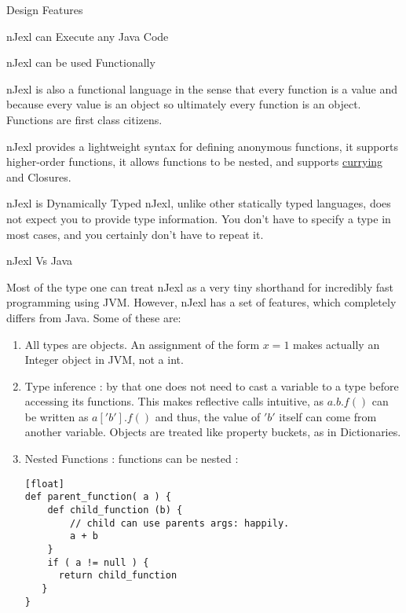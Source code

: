 \begin{section}{Design Features}
\begin{subsection}{nJexl can Execute any Java Code}
\end{subsection}


\begin{subsection}{nJexl can be used Functionally}

nJexl is also a functional language in the sense that every function is a value and because every value is an object so ultimately every function is an object. Functions are first class citizens.

nJexl provides a lightweight syntax for defining anonymous functions, it supports higher-order functions, it allows functions to be nested, and supports \href{https://en.wikipedia.org/wiki/Currying}{currying} and Closures. 

\end{subsection}

\begin{subsection}{nJexl is Dynamically Typed}
nJexl, unlike other statically typed languages, does not expect you to provide type information. 
You don't have to specify a type in most cases, and you certainly don't have to repeat it.

\end{subsection}

\begin{subsection}{nJexl Vs Java}

Most of the type one can treat nJexl as a very tiny shorthand for incredibly fast programming using JVM.
However, nJexl has a set of features, which completely differs from Java. Some of these are:

\begin{enumerate}

\item{ All types are objects. An assignment of the form $x = 1 $ makes actually an Integer object in JVM, not a int. }

\item { Type inference :  by that one does not need to cast a variable to a type before accessing its functions. 
    This makes reflective calls intuitive, as $ a.b.f() $ can be written as $ a['b'].f() $ and thus, the value of $'b'$
    itself can come from another variable. Objects are treated like property buckets, as in Dictionaries.  
}

\item { Nested Functions : functions can be nested :
\begin{lstlisting}[style=JexlStyle][float]
def parent_function( a ) {
    def child_function (b) {
        // child can use parents args: happily.
    	a + b 
    }
    if ( a != null ) {
      return child_function 
   }
}
\end{lstlisting}
}


\end{enumerate}
\end{subsection}
\end{section}

